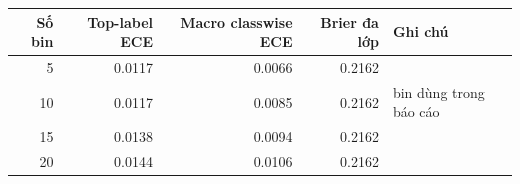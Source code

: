 \begin{tabular}{rrrrl}
\toprule
Số bin & Top-label ECE & Macro classwise ECE & Brier đa lớp & Ghi chú \\
\midrule
5 & 0.0117 & 0.0066 & 0.2162 &  \\
10 & 0.0117 & 0.0085 & 0.2162 & bin dùng trong báo cáo \\
15 & 0.0138 & 0.0094 & 0.2162 &  \\
20 & 0.0144 & 0.0106 & 0.2162 &  \\
\bottomrule
\end{tabular}
